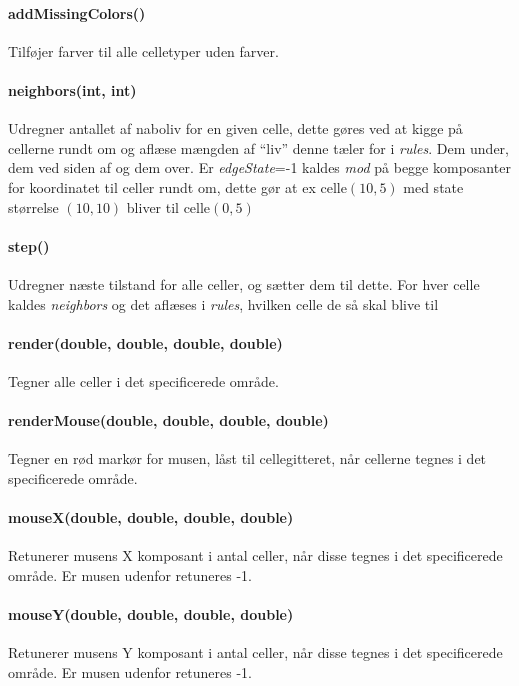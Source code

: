\paragraph{addMissingColors()} Tilføjer farver til alle celletyper uden farver.

\paragraph{neighbors(int, int)} Udregner antallet af naboliv for en given celle,
dette gøres ved at kigge på cellerne rundt om og aflæse mængden af ``liv'' denne tæler for i \emph{rules}.
Dem under, dem ved siden af og dem over. 
Er \emph{edgeState}=-1 kaldes \emph{mod} på begge komposanter for koordinatet til celler rundt om,
dette gør at ex celle$(10, 5)$ med state størrelse $(10, 10)$ bliver til celle$(0, 5)$

\paragraph{step()} Udregner næste tilstand for alle celler, og sætter dem til dette.
For hver celle kaldes \emph{neighbors} og det aflæses i \emph{rules}, hvilken celle de så skal blive til

\paragraph{render(double, double, double, double)} Tegner alle celler i det specificerede område.

\paragraph{renderMouse(double, double, double, double)} Tegner en rød markør for musen, låst til cellegitteret, når cellerne tegnes i det specificerede område.

\paragraph{mouseX(double, double, double, double)} Retunerer musens X komposant i antal celler, når disse tegnes i det specificerede område.
Er musen udenfor retuneres -1.

\paragraph{mouseY(double, double, double, double)} Retunerer musens Y komposant i antal celler, når disse tegnes i det specificerede område.
Er musen udenfor retuneres -1.

